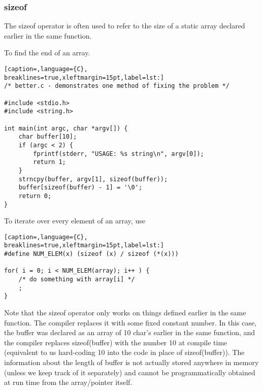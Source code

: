 \subsubsection{sizeof}
The sizeof operator is often used to refer to the size of a static array
declared earlier in the same function.

To find the end of an array.
\lstset{basicstyle=\scriptsize, numbers=left, captionpos=b, tabsize=4}
\begin{lstlisting}[caption=,language={C},
breaklines=true,xleftmargin=15pt,label=lst:]
/* better.c - demonstrates one method of fixing the problem */
 
#include <stdio.h>
#include <string.h>
 
int main(int argc, char *argv[]) {
	char buffer[10];
	if (argc < 2) {
		fprintf(stderr, "USAGE: %s string\n", argv[0]);
		return 1;
	}
	strncpy(buffer, argv[1], sizeof(buffer));
	buffer[sizeof(buffer) - 1] = '\0';
	return 0;
}
\end{lstlisting}

To iterate over every element of an array, use
\lstset{basicstyle=\scriptsize, numbers=left, captionpos=b, tabsize=4}
\begin{lstlisting}[caption=,language={C},
breaklines=true,xleftmargin=15pt,label=lst:]
#define NUM_ELEM(x) (sizeof (x) / sizeof (*(x)))

for( i = 0; i < NUM_ELEM(array); i++ ) {
	/* do something with array[i] */
	;
}
\end{lstlisting}

Note that the sizeof operator only works on things defined earlier in the same
function.  The compiler replaces it with some fixed constant number.  In this
case, the buffer was declared as an array of 10 char's earlier in the same
function, and the compiler replaces sizeof(buffer) with the number 10 at
compile time (equivalent to us hard-coding 10 into the code in place of
sizeof(buffer)).  The information about the length of buffer is not actually
stored anywhere in memory (unless we keep track of it separately) and cannot be
programmatically obtained at run time from the array/pointer itself.

